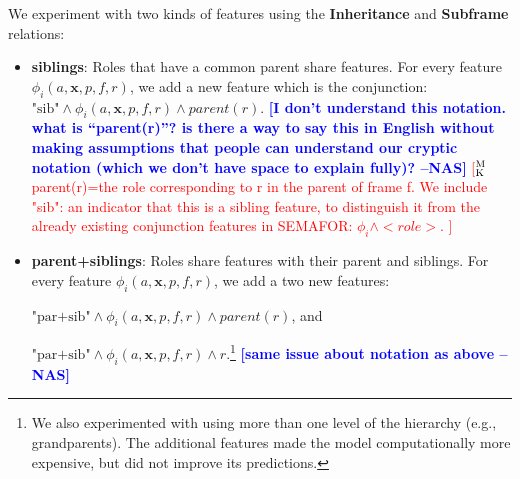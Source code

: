 \documentclass[11pt,a4paper]{article}
\newcommand{\exemplars}{\mathrm{ex}}
\newcommand{\fulltext}{\mathrm{ft}}
\newcommand{\ensuretext}[1]{#1}
\newcommand{\mkmarker}{\ensuretext{\textcolor{red}{\ensuremath{^{\textsc{M}}_{\textsc{K}}}}}}
\newcommand{\arkcomment}[3]{\ensuretext{\textcolor{#3}{[#1 #2]}}}
\newcommand{\mk}[1]{\arkcomment{\mkmarker}{#1}{red}}
\newcommand{\nascomment}[1]{\textcolor{blue}{\textbf{\small [#1 --NAS]}}}
\begin{document}
We experiment with two kinds of features using the \textbf{Inheritance} and \textbf{Subframe} relations:

\begin{itemize}
  \item 
\noindent\textbf{siblings}: Roles that have a common parent share features.
For every feature $\phi_i(a, \mathbf{x}, p, f, r)$, we add a new feature which is the conjunction: 
$\text{"sib"} \wedge \phi_i(a, \mathbf{x}, p, f, r) \wedge
\textit{parent}(r)$.  \nascomment{I don't understand this notation.
  what is ``parent(r)''?  is there a way to say this in English
  without making assumptions that people can understand our cryptic
  notation (which we don't have space to explain fully)?}
  \mk{ parent(r)=the role corresponding to r in the parent of frame f. 
  We include "sib": an indicator that this is a sibling feature, to distinguish it from the 
  already existing conjunction features in SEMAFOR: $\phi_i \wedge <role>$. }

  \item\noindent\textbf{parent+siblings}: Roles share features with their parent and siblings. 
For every feature $\phi_i(a, \mathbf{x}, p, f, r)$, we add a two new features:

\noindent$\text{"par+sib"} \wedge \phi_i(a, \mathbf{x}, p, f, r) \wedge \textit{parent}(r)$, and

\noindent$\text{"par+sib"} \wedge \phi_i(a, \mathbf{x}, p, f, r) \wedge r$.\footnote{We also experimented with using more than one level of the hierarchy (e.g., grandparents). 
The additional features made the model computationally more expensive, 
but did not improve its predictions.} \nascomment{same issue about
notation as above}
\end{itemize}




% 
\end{document}
